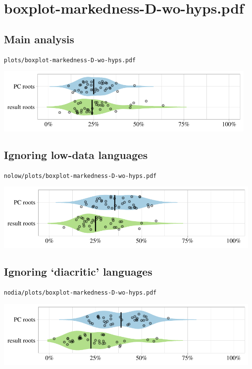 \eject

\section{boxplot-markedness-D-wo-hyps.pdf}

\subsection{Main analysis}

\texttt{plots/boxplot-markedness-D-wo-hyps.pdf}

\includegraphics[width=0.98\textwidth]{../plots/boxplot-markedness-D-wo-hyps.pdf}

\subsection{Ignoring low-data languages}

\texttt{nolow/plots/boxplot-markedness-D-wo-hyps.pdf}

\includegraphics[width=1.0\textwidth]{../nolow/plots/boxplot-markedness-D-wo-hyps.pdf}

\subsection{Ignoring `diacritic' languages}

\texttt{nodia/plots/boxplot-markedness-D-wo-hyps.pdf}

\includegraphics[width=1.0\textwidth]{../nodia/plots/boxplot-markedness-D-wo-hyps.pdf}

